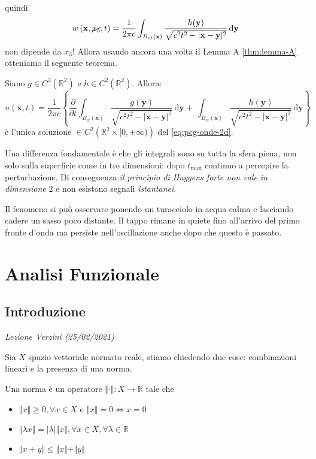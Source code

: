 \documentclass[10pt,a4paper,twoside,openright]{book}
\newcounter{conteggioV}
\newcommand{\LezioneV}[1]{
	\stepcounter{conteggioV}
	\textit{Lezione Verzini \arabic{conteggioV} (#1)}
	}
\newcommand{\x}{\mathbf{x}}
\newcommand{\y}{\mathbf{y}}
\newcommand{\de}{\,\mathrm d}
\newcommand{\dyy}{\de \y}
\begin{document}
\FloatBarrier
quindi
\begin{equation*}
    w\left(\x ,\cancel{x_{3}} ,t\right) =\frac{1}{2\pi c}\int _{B_{ct}(\x)}\frac{h(\y)}{\sqrt{c^{2} t^{2} -| \x -\y| ^{2}}} \dyy
\end{equation*}
non dipende da $\displaystyle x_{3}$! Allora usando ancora una volta il Lemma A \ref{thm:lemma-A} otteniamo il seguente teorema.
\begin{theorem}
     Siano $\displaystyle g\in C^{3}\left(\mathbb{R}^{2}\right)$ e $\displaystyle h\in C^{2}\left(\mathbb{R}^{2}\right)$. Allora:
    \begin{equation}
        u(\x ,t) =\frac{1}{2\pi c}\left\{\frac{\partial }{\partial t}\int _{B_{ct}(\x)}\frac{g(\y)}{\sqrt{c^{2} t^{2} -| \x -\y| ^{2}}} \dyy +\ \int _{B_{ct}(\x)}\frac{h(\y)}{\sqrt{c^{2} t^{2} -| \x -\y| ^{2}}} \dyy\right\}
    \end{equation}
    è l'unica soluzione $\displaystyle \in C^{2}\left(\mathbb{R}^{2} \times [ 0,+\infty)\right)$ del \eqref{eq:pcg-onde-2d}.
\end{theorem}
Una differenza fondamentale è che gli integrali sono su tutta la sfera piena, non solo sulla superficie come in tre dimensioni: dopo $\displaystyle t_{\max}$ continuo a percepire la perturbazione. Di conseguenza \textit{il principio di Huygens forte non vale in dimensione }$2$ e non esistono segnali \textit{istantanei}.

Il fenomeno si può osservare ponendo un turacciolo in acqua calma e lasciando cadere un sasso poco distante. Il tappo rimane in quiete fino all'arrivo del primo fronte d'onda ma persiste nell'oscillazione anche dopo che questo è passato.

\part{Analisi Funzionale}

\chapter{Introduzione}
\LezioneV{25/02/2021}

Sia $X$ spazio vettoriale normato reale, stiamo chiedendo due cose: combinazioni lineari e la presenza di una norma.

\begin{definition}
    [Norma] Una norma è un operatore $\Vert \cdotp \Vert :X\rightarrow \mathbb{R}$ tale che
    \begin{itemize}
        \item $\Vert x\Vert \geqslant 0,\forall x\in X$ e $\Vert x\Vert =0\Leftrightarrow x=0$
        \item $\Vert \lambda x\Vert =| \lambda | \Vert x\Vert,\forall x\in X,\forall \lambda \in \mathbb{R}$
        \item $\Vert x+y\Vert \leqslant \Vert x\Vert +\Vert y\Vert $
    \end{itemize}
\end{definition}
\end{document}
